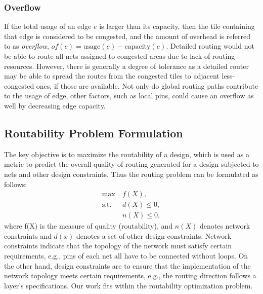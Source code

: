 \subsubsection{Overflow}
If the total usage of an edge $e$ is larger than its capacity, then the tile containing that edge is considered to be congested, and the amount of overhead is referred to as {\it overflow}, $of(e)=\text{usage}(e)-\text{capacity}(e)$. Detailed routing would not be able to route all nets assigned to congested areas due to lack of routing resources. However, there is generally a degree of tolerance as a detailed router may be able to spread the routes from the congested tiles to adjacent less-congested ones, if those are available. Not only do global routing paths contribute to the usage of edge, other factors, such as local pins, could cause an overflow as well by decreasing edge capacity.

\subsection{Routability Problem Formulation}
The key objective is to maximize the routability of a design, which is used as a metric to predict the overall quality of routing generated for a design subjected to nets and other design constraints.
Thus the routing problem can be formulated as follows:
\begin{subequations}
\begin{align*}
    \max  \       & f(X), \\
    \text{s.t.}~~ & d(X) \leq 0, \\
                  & n(X) \leq 0,
\end{align*}
\end{subequations}
where f(X) is the measure of quality (routability), and $n(X)$ denotes network constraints and $d(x)$ denotes a set of other design constraints.  Network constraints indicate that the topology of the network must satisfy certain requirements, e.g., pins of each net all have to be  connected without loops. On the other hand, design constraints are to ensure that the implementation of the network topology meets certain requirements, e.g., the routing direction follows a layer's specifications. Our work fits within the routability optimization problem.

